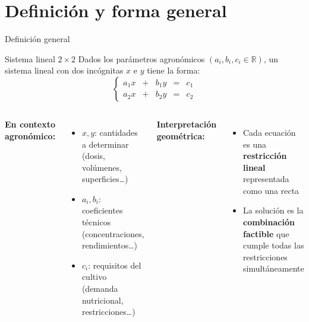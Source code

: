 \documentclass[11pt, aspectratio=169]{beamer}
\newcommand{\R}{\mathbb{R}}
\begin{document}
	\section{Definición y forma general}
	
	\begin{frame}{Definición general}
		\begin{block}{Sistema lineal $2\times2$}
			Dados los parámetros agronómicos $(a_i, b_i, c_i \in \R)$,
			un sistema lineal con dos incógnitas $x$ e $y$ tiene la forma:
			\[
			\left\{
			\begin{array}{rcrcr}
				a_1 x & + & b_1 y & = & c_1 \\[6pt]
				a_2 x & + & b_2 y & = & c_2
			\end{array}
			\right.
			\]
		\end{block}
		
		\vspace{0.3em}
		\begin{columns}[T]
			\textbf{En contexto agronómico:}
			\begin{itemize}
				\item $x, y$: cantidades a determinar\\
				(dosis, volúmenes, superficies\ldots)
				\item $a_i, b_i$: coeficientes técnicos\\
				(concentraciones, rendimientos\ldots)
				\item $c_i$: requisitos del cultivo\\
				(demanda nutricional, restricciones\ldots)
			\end{itemize}
			\textbf{Interpretación geométrica:}
			\begin{itemize}
				\item Cada ecuación es una \textbf{restricción lineal}
				representada como una recta
				\item La solución es la \textbf{combinación factible}
				que cumple todas las restricciones simultáneamente
			\end{itemize}
		\end{columns}
	\end{frame}
	
\end{document}
